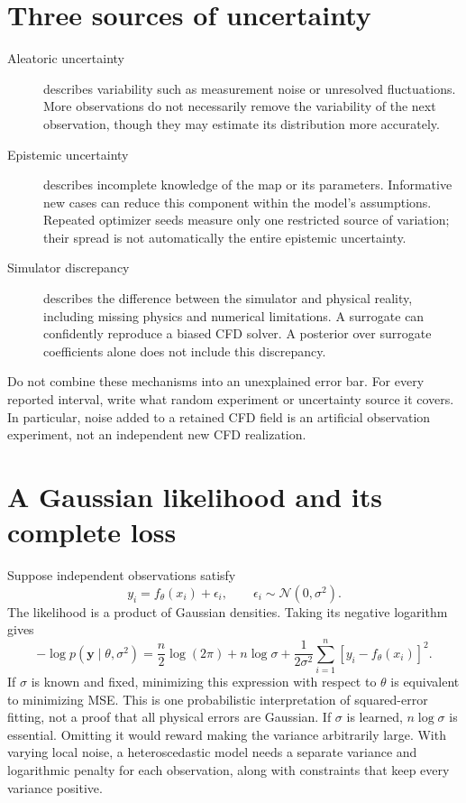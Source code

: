 \documentclass[11pt]{article}
\begin{document}
\section{Three sources of uncertainty}
\begin{description}
\item[Aleatoric uncertainty] describes variability such as measurement noise
or unresolved fluctuations. More observations do not necessarily remove the
variability of the next observation, though they may estimate its distribution
more accurately.
\item[Epistemic uncertainty] describes incomplete knowledge of the map or its
parameters. Informative new cases can reduce this component within the model's
assumptions. Repeated optimizer seeds measure only one restricted source of
variation; their spread is not automatically the entire epistemic uncertainty.
\item[Simulator discrepancy] describes the difference between the simulator
and physical reality, including missing physics and numerical limitations.
A surrogate can confidently reproduce a biased CFD solver. A posterior over
surrogate coefficients alone does not include this discrepancy.
\end{description}
Do not combine these mechanisms into an unexplained error bar. For every
reported interval, write what random experiment or uncertainty source it covers.
In particular, noise added to a retained CFD field is an artificial observation
experiment, not an independent new CFD realization.

\section{A Gaussian likelihood and its complete loss}
Suppose independent observations satisfy
\[
y_i=f_\theta(x_i)+\epsilon_i,\qquad \epsilon_i\sim\mathcal N(0,\sigma^2).
\]
The likelihood is a product of Gaussian densities. Taking its negative logarithm gives
\[
-\log p(\mathbf y\mid\theta,\sigma^2)
=\frac n2\log(2\pi)+n\log\sigma+
\frac{1}{2\sigma^2}\sum_{i=1}^n[y_i-f_\theta(x_i)]^2.
\]
If $\sigma$ is known and fixed, minimizing this expression with respect to
$\theta$ is equivalent to minimizing MSE. This is one probabilistic
interpretation of squared-error fitting, not a proof that all physical errors
are Gaussian. If $\sigma$ is learned, $n\log\sigma$ is essential. Omitting it
would reward making the variance arbitrarily large. With varying local noise,
a heteroscedastic model needs a separate variance and logarithmic penalty for
each observation, along with constraints that keep every variance positive.
\end{document}

